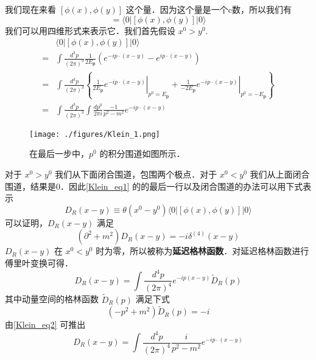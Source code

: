 我们现在来看 $[\phi(x),\phi(y)]$ 这个量．因为这个量是一个c数，所以我们有
\begin{equation}
[\phi(x),\phi(y)] = \langle 0 | [\phi(x),\phi(y)] | 0 \rangle
\end{equation}
我们可以用四维形式来表示它．我们首先假设 $x^0>y^0$.
\begin{equation}\label{Klein_eq1}
\begin{aligned}
& \langle 0|[\phi(x), \phi(y)]| 0\rangle\\
=&\int \frac{d^{3} p}{(2 \pi)^{3}} \frac{1}{2 E_{\mathbf{p}}}\left(e^{-i p \cdot(x-y)}-e^{i p \cdot(x-y)}\right) \\ 
=& \int \frac{d^{3} p}{(2 \pi)^{3}}\left\{\left.\frac{1}{2 E_{\mathbf{p}}} e^{-i p \cdot(x-y)}\right|_{p^{0}=E_{\mathbf{p}}}+\left.\frac{1}{-2 E_{\mathbf{p}}} e^{-i p \cdot(x-y)}\right|_{p^{0}=-E_{\mathbf{p}}}\right\} \\
=& \int \frac{d^{3} p}{(2 \pi)^{3}} \int \frac{d p^{0}}{2 \pi i} \frac{-1}{p^{2}-m^{2}} e^{-i p \cdot(x-y)} 
\end{aligned}
\end{equation}
\begin{figure}[ht]
\centering
\texttt{[image: ./figures/Klein\_1.png]}
\caption{在最后一步中，$p^0$ 的积分围道如图所示．} \label{Klein_fig1}
\end{figure}
对于 $x^0>y^0$ 我们从下面闭合围道，包围两个极点．对于 $x^0<y^0$ 我们从上面闭合围道，结果是0．因此\autoref{Klein_eq1} 的的最后一行以及闭合围道的办法可以用下式表示
\begin{equation}
D_R(x-y)\equiv \theta(x^0-y^0)\langle 0 | [\phi(x),\phi(y)]|0 \rangle
\end{equation}
可以证明，$D_R(x-y)$ 满足
\begin{equation}
(\partial^2+m^2)D_R(x-y) = -i \delta^{(4)}(x-y)
\end{equation}
$D_R(x-y)$ 在 $x^0<y^0$ 时为零，所以被称为\textbf{延迟格林函数}．对延迟格林函数进行傅里叶变换可得．
\begin{equation}
D_R(x-y) = \int \frac{d^4p}{(2\pi)^4} e^{-ip(x-y)} \tilde D_R (p)
\end{equation}
其中动量空间的格林函数 $\tilde D_R(p)$ 满足下式
\begin{equation}\label{Klein_eq2}
(-p^2+m^2) \tilde D_R(p) = -i
\end{equation}
由\autoref{Klein_eq2} 可推出
\begin{equation}
D_R (x-y) = \int \frac{d^4p}{(2\pi)^4} \frac{i}{p^2-m^2} e^{-ip\cdot(x-y)}
\end{equation}
